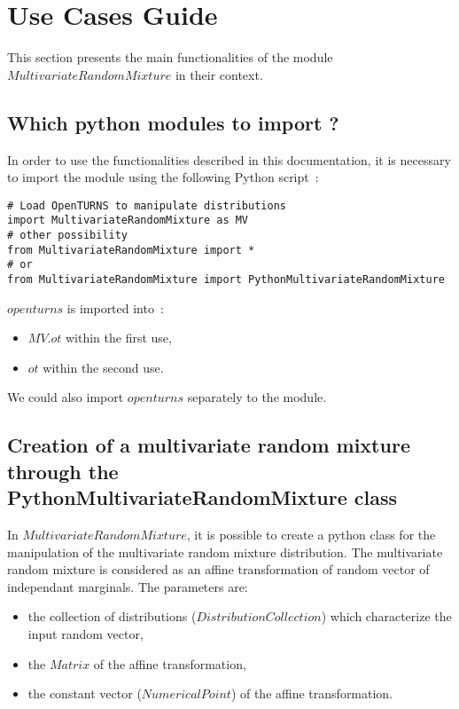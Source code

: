 



\section{Use Cases Guide}

This section presents the main functionalities of the module $MultivariateRandomMixture$ in their context.



\subsection{Which python modules to import ?}

In order to use the functionalities described in this documentation, it is necessary to import the module 
using the following Python script~:

\begin{lstlisting}
# Load OpenTURNS to manipulate distributions
import MultivariateRandomMixture as MV
# other possibility
from MultivariateRandomMixture import *
# or
from MultivariateRandomMixture import PythonMultivariateRandomMixture
\end{lstlisting}
$openturns$ is imported into~: 
\begin{itemize}
   \item $MV.ot$ within the first use,
   \item $ot$ within the second use.
\end{itemize}

We could also import $openturns$ separately to the module.


\subsection{Creation of a multivariate random mixture through the PythonMultivariateRandomMixture class} \label{MVRM}

In $MultivariateRandomMixture$, it is possible to create a python class for the manipulation of the multivariate random mixture distribution.
The multivariate random mixture is considered as an affine transformation of random vector of independant marginals. 
The parameters are:
\begin{itemize}
 \item the collection of distributions ($DistributionCollection$) which characterize the input random vector,
 \item the $Matrix$ of the affine transformation, 
 \item the constant vector ($NumericalPoint$) of the affine transformation.
\end{itemize}

